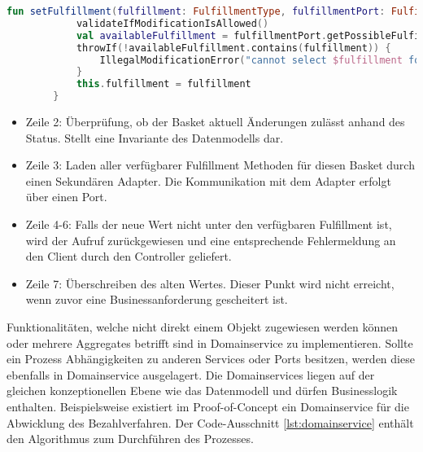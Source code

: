 
\begin{minipage}{\linewidth} %
	\begin{lstlisting}[caption={Setzen der Fulfillment Methode im Basket Aggregate}, label={lst:basket}, language=Kotlin]
		fun setFulfillment(fulfillment: FulfillmentType, fulfillmentPort: FulfillmentPort) {
			validateIfModificationIsAllowed()
			val availableFulfillment = fulfillmentPort.getPossibleFulfillment(outletId)
			throwIf(!availableFulfillment.contains(fulfillment)) {
				IllegalModificationError("cannot select $fulfillment for outlet $outletId")
			}
			this.fulfillment = fulfillment
		}
	\end{lstlisting}
\end{minipage}

\begin{itemize}[noitemsep,nolistsep]
	\item Zeile 2: Überprüfung, ob der Basket aktuell Änderungen zulässt anhand des Status. Stellt eine Invariante des Datenmodells dar.
	\item Zeile 3: Laden aller verfügbarer Fulfillment Methoden für diesen Basket durch einen Sekundären Adapter. Die Kommunikation mit dem Adapter erfolgt über einen Port.
	\item Zeile 4-6: Falls der neue Wert nicht unter den verfügbaren Fulfillment ist, wird der Aufruf zurückgewiesen und eine entsprechende Fehlermeldung an den Client durch den Controller geliefert.
	\item Zeile 7: Überschreiben des alten Wertes. Dieser Punkt wird nicht erreicht, wenn zuvor eine Businessanforderung gescheitert ist.
\end{itemize}

Funktionalitäten, welche nicht direkt einem Objekt zugewiesen werden können oder mehrere Aggregates betrifft sind in Domainservice zu implementieren. Sollte ein Prozess Abhängigkeiten zu anderen Services oder Ports besitzen, werden diese ebenfalls in Domainservice ausgelagert. Die Domainservices liegen auf der gleichen konzeptionellen Ebene wie das Datenmodell und dürfen Businesslogik enthalten. Beispielsweise existiert im Proof-of-Concept ein Domainservice für die Abwicklung des Bezahlverfahren. Der Code-Ausschnitt \ref{lst:domainservice} enthält den Algorithmus zum Durchführen des Prozesses. 

